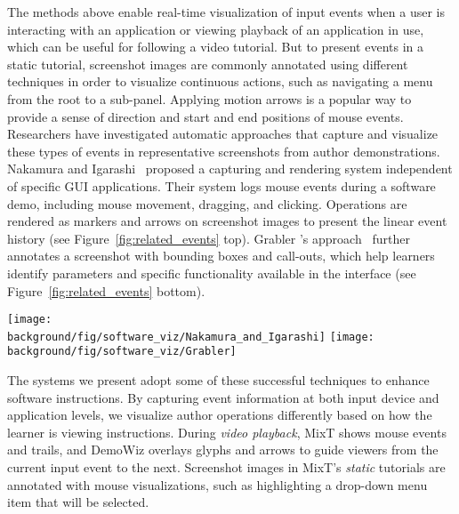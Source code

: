 The methods above enable real-time visualization of input events when a user is interacting with an application or viewing playback of an application in use, which can be useful for following a video tutorial.
%
But to present events in a static tutorial, screenshot images are commonly annotated using different techniques in order to visualize continuous actions, such as navigating a menu from the root to a sub-panel. Applying motion arrows is a popular way to provide a sense of direction and start and end positions of mouse events.
%
Researchers have investigated automatic approaches that capture and visualize these types of events in representative screenshots from author demonstrations. Nakamura and Igarashi~\cite{Nakamura:2008:ASV:1449715.1449721} proposed a capturing and rendering system independent of specific GUI applications. Their system logs mouse events during a software demo, including mouse movement, dragging, and clicking. Operations are rendered as markers and arrows on screenshot images to present the linear event history (see Figure~\ref{fig:related_events} top).
%
Grabler \ea{}'s approach~\cite{Grabler:2009jj} further annotates a screenshot with bounding boxes and call-outs, which help learners identify parameters and specific functionality available in the interface (see Figure~\ref{fig:related_events} bottom).

\begin{figure*}[t!]
  \centering
  \texttt{[image: \\background/fig/software\_viz/Nakamura\_and\_Igarashi]}
  \texttt{[image: \\background/fig/software\_viz/Grabler]}
  \caption{Examples where software operations are automatically rendered on top of application screenshots, including (top) moving the mouse, dragging, clicking, and scrolling by Nakamura and Igarashi~\cite{Nakamura:2008:ASV:1449715.1449721} and (bottom) application-specific operations (a-b), parameter setting (c-f), and image manipulations (g-f) by Grabler \ea{}~\cite{Grabler:2009jj}.}
  \label{fig:related_events}
\end{figure*}

The systems we present adopt some of these successful techniques to enhance software instructions. By capturing event information at both input device and application levels, we visualize author operations differently based on how the learner is viewing instructions.
%
During \emph{video playback}, MixT shows mouse events and trails, and DemoWiz overlays glyphs and arrows to guide viewers from the current input event to the next.
%
Screenshot images in MixT's \emph{static} tutorials are annotated with mouse visualizations, such as highlighting a drop-down menu item that will be selected.

